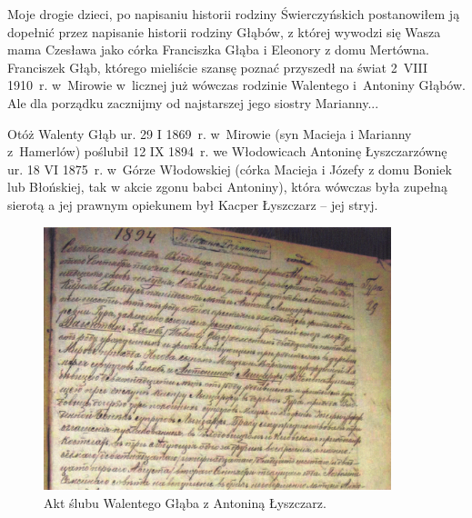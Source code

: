 Moje drogie dzieci, po napisaniu historii rodziny Świerczyńskich postanowiłem ją dopełnić przez napisanie historii rodziny Głąbów, z której wywodzi się Wasza mama Czesława jako córka Franciszka Głąba i Eleonory z domu Mertówna. Franciszek Głąb, którego mieliście szansę poznać przyszedł na świat 2~VIII 1910~r. w~Mirowie w~licznej już wówczas rodzinie Walentego i~Antoniny Głąbów. Ale dla porządku zacznijmy od najstarszej jego siostry Marianny...

Otóż Walenty Głąb ur. 29 I 1869~r. w~Mirowie (syn Macieja i Marianny z~Hamerlów) poślubił 12 IX 1894~r. we Włodowicach Antoninę Łyszczarzównę ur. 18 VI 1875~r. w~Górze Włodowskiej (córka Macieja i Józefy z domu Boniek lub Błońskiej, tak w akcie zgonu babci Antoniny), która wówczas była zupełną sierotą a jej prawnym opiekunem był Kacper Łyszczarz -- jej stryj.

\begin{figure}[!h]
\begin{center}
\includegraphics[width=0.9\textwidth]{zdjecia/akt_slubu_walentego_glaba_i_antoniny_lyszczarz.jpg}
\caption{Akt ślubu Walentego Głąba z Antoniną Łyszczarz.}
\label{rys:akt_slubu_walentego_glaba_i_antoniny_lyszczarz}
\end{center}
\end{figure}
